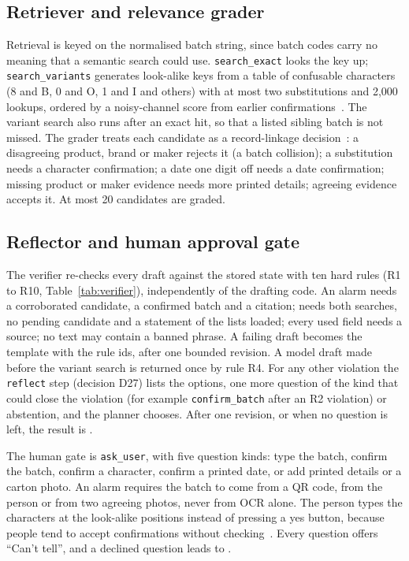 \subsection{Retriever and relevance grader}

Retrieval is keyed on the normalised batch string, since batch codes carry no meaning that a
semantic search could use. \texttt{search\_exact} looks the key up; \texttt{search\_variants}
generates look-alike keys from a table of confusable characters (8 and B, 0 and O, 1 and I and
others) with at most two substitutions and 2{,}000 lookups, ordered by a noisy-channel score from
earlier confirmations~\cite{kernighan1990spelling,brill2000improved}. The variant search also runs
after an exact hit, so that a listed sibling batch is not missed. The grader treats each candidate as
a record-linkage decision~\cite{fellegi1969theory,christen2012survey}: a disagreeing product, brand
or maker rejects it (a batch collision); a substitution needs a character confirmation; a date one
digit off needs a date confirmation; missing product or maker evidence needs more printed details;
agreeing evidence accepts it. At most 20 candidates are graded.

\subsection{Reflector and human approval gate}

The verifier re-checks every draft against the stored state with ten hard rules (R1 to R10,
Table~\ref{tab:verifier}), independently of the drafting code. An alarm needs a corroborated
candidate, a confirmed batch and a citation; \NLISTED{} needs both searches, no pending candidate and
a statement of the lists loaded; every used field needs a source; no text may contain a banned
phrase. A failing draft becomes the \CANTV{} template with the rule ids, after one bounded
revision. A model draft made before the variant search is returned once by rule R4. For any other
violation the \texttt{reflect} step (decision D27) lists the options, one more question of the kind that could close the
violation (for example \texttt{confirm\_batch} after an R2 violation) or abstention, and the planner chooses. After one
revision, or when no question is left, the result is \CANTV.

The human gate is \texttt{ask\_user}, with five question kinds: type the batch, confirm the batch,
confirm a character, confirm a printed date, or add printed details or a carton photo. An alarm
requires the batch to come from a QR code, from the person or from two agreeing photos, never from
OCR alone. The person types the characters at the look-alike positions instead of pressing a yes
button, because people tend to accept confirmations without
checking~\cite{parasuraman2010complacency,bucinca2021trust}. Every question offers ``Can't tell'',
and a declined question leads to \CANTV.

